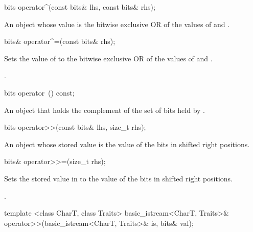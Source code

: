 \begin{itemdecl}
bits operator^(const bits& lhs, const bits& rhs);		
\end{itemdecl}

\begin{itemdescr}
\returns An object whose value is the bitwise exclusive OR of the values of  and .		
\end{itemdescr}

\begin{itemdecl}
bits& operator^=(const bits& rhs);		
\end{itemdecl}

\begin{itemdescr}
\effects Sets the value of  to the bitwise exclusive OR of the values of  and .

\returns {}.		
\end{itemdescr}

\begin{itemdecl}
bits operator~() const;		
\end{itemdecl}

\begin{itemdescr}
\returns An object that holds the complement of the set of bits held by .		
\end{itemdescr}

\begin{itemdecl}
bits operator>>(const bits& lhs, size_t rhs);		
\end{itemdecl}

\begin{itemdescr}
\returns An object whose stored value is the value of the bits in  shifted right  positions.		
\end{itemdescr}

\begin{itemdecl}
bits& operator>>=(size_t rhs);		
\end{itemdecl}

\begin{itemdescr}
\effects Sets the stored value in  to the value of the bits in  shifted right  positions.

\returns {}.		
\end{itemdescr}

\begin{itemdecl}
template <class CharT, class Traits>
  basic_istream<CharT, Traits>& operator>>(basic_istream<CharT, Traits>& is,
                                           bits& val);		
\end{itemdecl}

